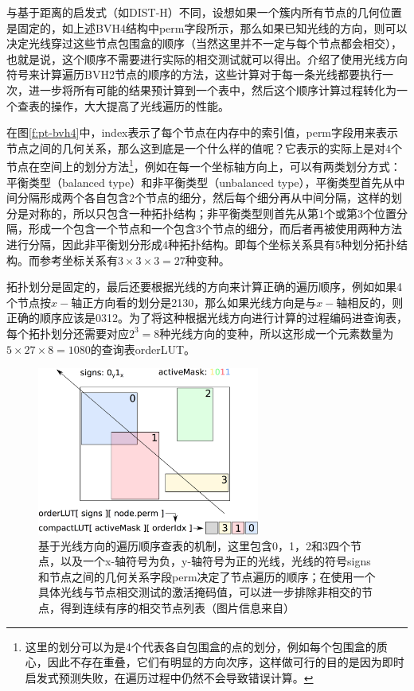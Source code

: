 与基于距离的启发式（如DIST-H）不同，设想如果一个簇内所有节点的几何位置是固定的，如上述BVH4结构中perm字段所示，那么如果已知光线的方向，则可以决定光线穿过这些节点包围盒的顺序（当然这里并不一定与每个节点都会相交），也就是说，这个顺序不需要进行实际的相交测试就可以得出。\cite{a:RayTracingDeformableScenesUsingDynamicBoundingVolumeHierarchies}介绍了使用光线方向符号来计算遍历BVH2节点的顺序的方法，这些计算对于每一条光线都要执行一次，\cite{a:EfficientRayTracingKernelsforModernCPUArchitectures}进一步将所有可能的结果预计算到一个表中，然后这个顺序计算过程转化为一个查表的操作，大大提高了光线遍历的性能。

在图\ref{f:pt-bvh4}中，index表示了每个节点在内存中的索引值，perm字段用来表示节点之间的几何关系，那么这到底是一个什么样的值呢？它表示的实际上是对4个节点在空间上的划分方法\footnote{这里的划分可以为是4个代表各自包围盒的点的划分，例如每个包围盒的质心，因此不存在重叠，它们有明显的方向次序，这样做可行的目的是因为即时启发式预测失败，在遍历过程中仍然不会导致错误计算。}，例如在每一个坐标轴方向上，可以有两类划分方式：平衡类型（balanced type）和非平衡类型（unbalanced type），平衡类型首先从中间分隔形成两个各自包含2个节点的细分，然后每个细分再从中间分隔，这样的划分是对称的，所以只包含一种拓扑结构；非平衡类型则首先从第1个或第3个位置分隔，形成一个包含一个节点和一个包含3个节点的细分，而后者再被使用两种方法进行分隔，因此非平衡划分形成4种拓扑结构。即每个坐标关系具有5种划分拓扑结构。而参考坐标关系有$3\times 3\times 3=27$种变种。

拓扑划分是固定的，最后还要根据光线的方向来计算正确的遍历顺序，例如如果4个节点按$x-$轴正方向看的划分是2130，那么如果光线方向是与$x-$轴相反的，则正确的顺序应该是0312。为了将这种根据光线方向进行计算的过程编码进查询表，每个拓扑划分还需要对应$2^{3}=8$种光线方向的变种，所以这形成一个元素数量为$5\times 27 \times 8=1080$的查询表orderLUT。

\begin{figure}
	\sidecaption
	\includegraphics[width=0.65\textwidth]{figures/pt/ordered-traversal}
	\caption{基于光线方向的遍历顺序查表的机制，这里包含0，1，2和3四个节点，以及一个x-轴符号为负，y-轴符号为正的光线，光线的符号signs和节点之间的几何关系字段perm决定了节点遍历的顺序；在使用一个具体光线与节点相交测试的激活掩码值，可以进一步排除非相交的节点，得到连续有序的相交节点列表（图片信息来自\cite{a:EfficientRayTracingKernelsforModernCPUArchitectures}）}
	\label{f:pt-ordered-traversal}
\end{figure}

